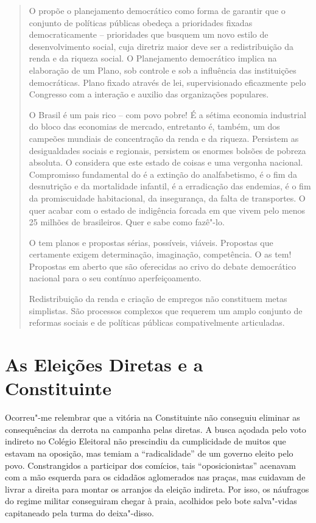 \begin{quote}
O  propõe o planejamento democrático como forma de garantir que o
conjunto de políticas públicas obedeça a prioridades fixadas
democraticamente -- prioridades que busquem um novo estilo de
desenvolvimento social, cuja diretriz maior deve ser a redistribuição da
renda e da riqueza social. O Planejamento democrático implica na
elaboração de um Plano, sob controle e sob a influência das
instituições democráticas. Plano fixado através de lei, supervisionado eficazmente
pelo Congresso com a interação e auxilio das organizações populares.

O Brasil é um pais rico -- com povo pobre! É a sétima economia
industrial do bloco das economias de mercado, entretanto é, também, um
dos campeões mundiais de concentração da renda e da riqueza. Persistem
as desigualdades sociais e regionais, persistem os enormes bolsões de
pobreza absoluta. O  considera que este estado de coisas e uma
vergonha nacional. Compromisso fundamental do  é a extinção do
analfabetismo, é o fim da desnutrição e da mortalidade infantil, é a
erradicação das endemias, é o fim da promiscuidade habitacional, da
insegurança, da falta de transportes. O  quer acabar com o estado de
indigência forcada em que vivem pelo menos 25 milhões de brasileiros.
Quer e sabe como fazê"-lo.

O  tem planos e propostas sérias,
possíveis, viáveis. Propostas que certamente exigem determinação,
imaginação, competência. O  as tem! Propostas em aberto que são
oferecidas ao crivo do debate democrático nacional para o seu contínuo
aperfeiçoamento.

Redistribuição da renda e criação de empregos não
constituem metas simplistas. São processos complexos que requerem um
amplo conjunto de reformas sociais e de políticas públicas
compativelmente articuladas.
\end{quote}

\section{As Eleições Diretas e a Constituinte}

Ocorreu"-me relembrar que a vitória na Constituinte não conseguiu
eliminar as consequências da derrota na campanha pelas diretas. A busca
açodada pelo voto indireto no Colégio Eleitoral não prescindiu da
cumplicidade de muitos que estavam na oposição, mas temiam a
``radicalidade'' de um governo eleito pelo povo. Constrangidos a
participar dos comícios, tais ``oposicionistas'' acenavam com a mão
esquerda para os cidadãos aglomerados nas praças, mas cuidavam de livrar
a direita para montar os arranjos da eleição indireta. Por isso, os
náufragos do regime militar conseguiram chegar à praia, acolhidos pelo
bote salva"-vidas capitaneado pela turma do deixa"-disso.

